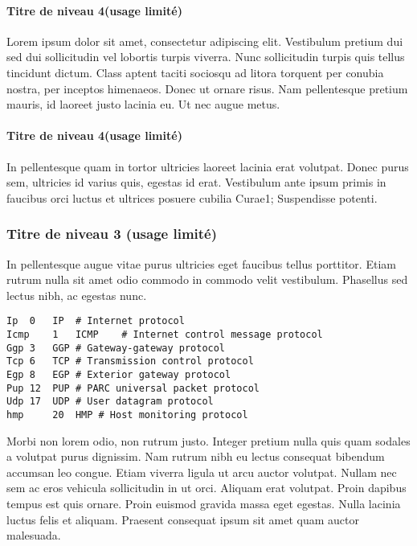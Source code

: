 ﻿\documentclass[year=2013]{jres}
\begin{document}
\paragraph{Titre de niveau 4(usage limité)}

Lorem ipsum dolor sit amet, consectetur adipiscing elit. Vestibulum pretium dui sed dui sollicitudin vel lobortis turpis viverra. 
Nunc sollicitudin turpis quis tellus tincidunt dictum. Class aptent taciti sociosqu ad litora torquent per conubia nostra, per inceptos himenaeos. Donec ut ornare risus. Nam pellentesque pretium mauris, id laoreet justo lacinia eu. Ut nec augue metus. 

\paragraph{Titre de niveau 4(usage limité)}

In pellentesque quam in tortor ultricies laoreet lacinia erat volutpat. Donec purus sem, ultricies id varius quis, egestas id erat. Vestibulum ante ipsum primis in faucibus orci luctus et ultrices posuere cubilia Curae1; Suspendisse potenti. 

\subsubsection{Titre de niveau 3 (usage limité)}

In pellentesque augue vitae purus ultricies eget faucibus tellus porttitor. Etiam rutrum nulla sit amet odio commodo in commodo velit vestibulum. Phasellus sed lectus nibh, ac egestas nunc.

\begin{lstlisting}
Ip	0	IP	# Internet protocol
Icmp	1	ICMP	# Internet control message protocol
Ggp	3	GGP	# Gateway-gateway protocol
Tcp	6	TCP	# Transmission control protocol
Egp	8	EGP	# Exterior gateway protocol
Pup	12	PUP	# PARC universal packet protocol
Udp	17	UDP	# User datagram protocol
hmp 	20	HMP	# Host monitoring protocol
\end{lstlisting}

Morbi non lorem odio, non rutrum justo. Integer pretium nulla quis quam sodales a volutpat purus dignissim. Nam rutrum nibh eu lectus consequat bibendum accumsan leo congue. Etiam viverra ligula ut arcu auctor volutpat. Nullam nec sem ac eros vehicula sollicitudin in ut orci. Aliquam erat volutpat. Proin dapibus tempus est quis ornare. Proin euismod gravida massa eget egestas. Nulla lacinia luctus felis et aliquam. Praesent consequat ipsum sit amet quam auctor malesuada.
\end{document}
